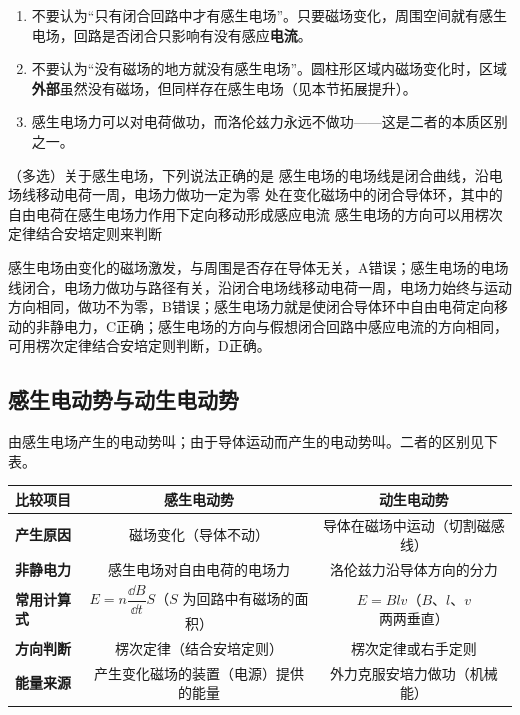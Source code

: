 \begin{yicuo}
\begin{enumerate}[label=（\arabic*）,leftmargin=2.4em]
  \item 不要认为“只有闭合回路中才有感生电场”。只要磁场变化，周围空间就有感生电场，回路是否闭合只影响有没有感应\textbf{电流}。
  \item 不要认为“没有磁场的地方就没有感生电场”。圆柱形区域内磁场变化时，区域\textbf{外部}虽然没有磁场，但同样存在感生电场（见本节拓展提升）。
  \item 感生电场力可以对电荷做功，而洛伦兹力永远不做功——这是二者的本质区别之一。
\end{enumerate}
\end{yicuo}

\begin{liti}
（多选）关于感生电场，下列说法正确的是
%
{感生电场的电场线是闭合曲线，沿电场线移动电荷一周，电场力做功一定为零}%
{处在变化磁场中的闭合导体环，其中的自由电荷在感生电场力作用下定向移动形成感应电流}%
{感生电场的方向可以用楞次定律结合安培定则来判断}
\begin{jiexi}[2cm]
感生电场由变化的磁场激发，与周围是否存在导体无关，A错误；感生电场的电场线闭合，电场力做功与路径有关，沿闭合电场线移动电荷一周，电场力始终与运动方向相同，做功不为零，B错误；感生电场力就是使闭合导体环中自由电荷定向移动的非静电力，C正确；感生电场的方向与假想闭合回路中感应电流的方向相同，可用楞次定律结合安培定则判断，D正确。
\end{jiexi}
\end{liti}

\subsection{感生电动势与动生电动势}

由感生电场产生的电动势叫；由于导体运动而产生的电动势叫。二者的区别见下表。

\begin{center}
\small
\begin{tabularx}{0.96\linewidth}{>{\sffamily\bfseries\centering\arraybackslash}m{2.1cm} C C}
\toprule
\textbf{比较项目} & \textbf{感生电动势} & \textbf{动生电动势} \\
\midrule
产生原因 & 磁场变化（导体不动） & 导体在磁场中运动（切割磁感线） \\
非静电力 & 感生电场对自由电荷的电场力 & 洛伦兹力沿导体方向的分力 \\
常用计算式 & $E=n\dfrac{\dd B}{\dd t}S$（$S$ 为回路中有磁场的面积） & $E=Blv$（$B$、$l$、$v$ 两两垂直） \\
方向判断 & 楞次定律（结合安培定则） & 楞次定律或右手定则 \\
能量来源 & 产生变化磁场的装置（电源）提供的能量 & 外力克服安培力做功（机械能） \\
\bottomrule
\end{tabularx}
\end{center}

